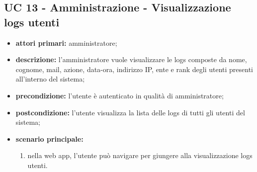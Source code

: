 		\subsection{UC 13 - Amministrazione - Visualizzazione logs utenti}
		\begin{itemize}
			\item \textbf{attori primari:} amministratore;
			\item \textbf{descrizione:} l'amministratore vuole visualizzare le logs composte da nome, cognome, mail, azione, data-ora, indirizzo IP, ente e rank degli utenti presenti all'interno del sistema;
			\item \textbf{precondizione:} l'utente è autenticato in qualità di amministratore;
			\item \textbf{postcondizione:} l'utente visualizza la lista delle logs di tutti gli utenti del sistema;
			\item \textbf{scenario principale:}
			\begin{enumerate}
				\item nella web app, l'utente può navigare per giungere alla visualizzazione logs utenti.
			\end{enumerate}
		\end{itemize}

